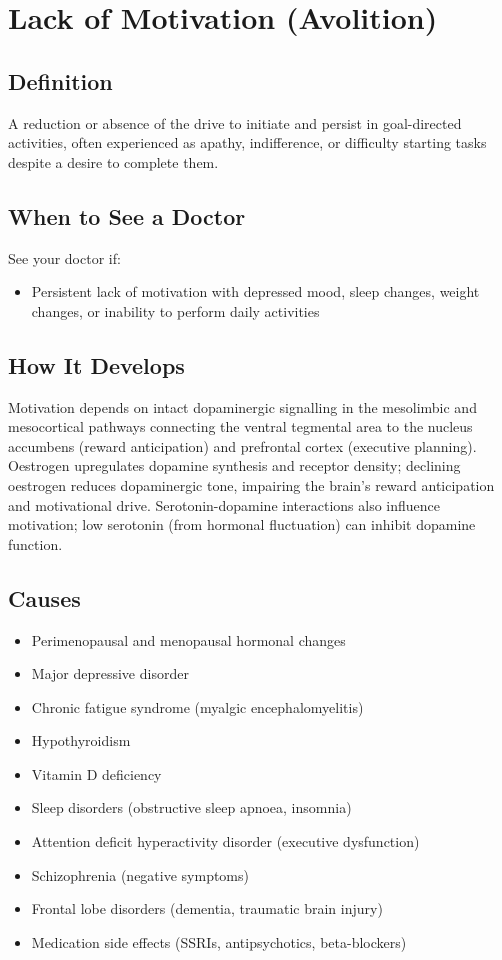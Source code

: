 \chapter{Lack of Motivation (Avolition)}

\section*{Definition}
A reduction or absence of the drive to initiate and persist in goal-directed activities, often experienced as apathy, indifference, or difficulty starting tasks despite a desire to complete them.

\section*{When to See a Doctor}
See your doctor if:
\begin{itemize}
  \item Persistent lack of motivation with depressed mood, sleep changes, weight changes, or inability to perform daily activities
\end{itemize}

\section*{How It Develops}
Motivation depends on intact dopaminergic signalling in the mesolimbic and mesocortical pathways connecting the ventral tegmental area to the nucleus accumbens (reward anticipation) and prefrontal cortex (executive planning). Oestrogen upregulates dopamine synthesis and receptor density; declining oestrogen reduces dopaminergic tone, impairing the brain's reward anticipation and motivational drive. Serotonin-dopamine interactions also influence motivation; low serotonin (from hormonal fluctuation) can inhibit dopamine function.

\section*{Causes}
\begin{itemize}
  \item Perimenopausal and menopausal hormonal changes
  \item Major depressive disorder
  \item Chronic fatigue syndrome (myalgic encephalomyelitis)
  \item Hypothyroidism
  \item Vitamin D deficiency
  \item Sleep disorders (obstructive sleep apnoea, insomnia)
  \item Attention deficit hyperactivity disorder (executive dysfunction)
  \item Schizophrenia (negative symptoms)
  \item Frontal lobe disorders (dementia, traumatic brain injury)
  \item Medication side effects (SSRIs, antipsychotics, beta-blockers)
\end{itemize}

